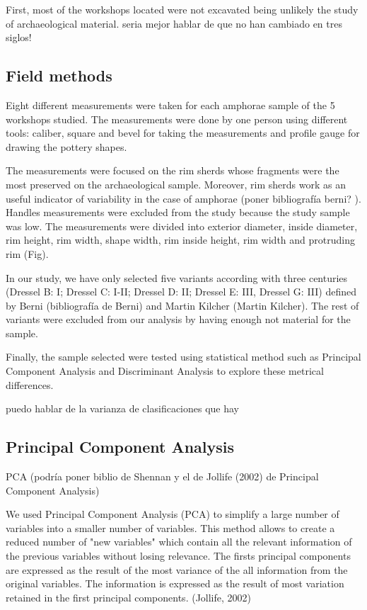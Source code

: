 \documentclass[review]{elsarticle}
\begin{document}
First, most of the workshops located were not excavated being unlikely the study of archaeological material. seria mejor hablar de que no han cambiado en tres siglos! 



\subsection{Field methods}


Eight different measurements were taken for each amphorae sample of the 5 workshops studied. The measurements were done by one person using different tools: caliber, square and bevel for taking the measurements and profile gauge for drawing the pottery shapes. 

The measurements were focused on the rim sherds whose fragments were the most preserved on the archaeological sample. Moreover, rim sherds work as an useful indicator of variability in the case of amphorae (poner bibliografía berni? ). Handles measurements were excluded from the study because the study sample was low. The measurements were divided into exterior diameter, inside diameter, rim height, rim width, shape width, rim inside height, rim width and protruding rim (Fig). 

In our study, we have only selected five variants according with three centuries (Dressel B: I; Dressel C: I-II; Dressel D: II; Dressel E: III, Dressel G: III) defined by Berni (bibliografía de Berni) and Martin Kilcher (Martin Kilcher). The rest of variants were excluded from our analysis by having enough not material for the sample. 

Finally, the sample selected were tested using statistical method such as Principal Component Analysis and Discriminant Analysis to explore these metrical differences. 
 
puedo hablar de la varianza de clasificaciones que hay

\subsection{Principal Component Analysis}

PCA (podría poner biblio de Shennan y el de Jollife (2002) de Principal Component Analysis)

We used Principal Component Analysis (PCA) to simplify a large number of variables into a smaller number of variables. This method allows to create a reduced number of "new variables" which contain all the relevant information of the previous variables without losing relevance. The firsts principal components are expressed as the result of the most variance of the all information from the original variables.  
The information is expressed as the result of most variation retained in the first principal components. (Jollife, 2002)
\end{document}
